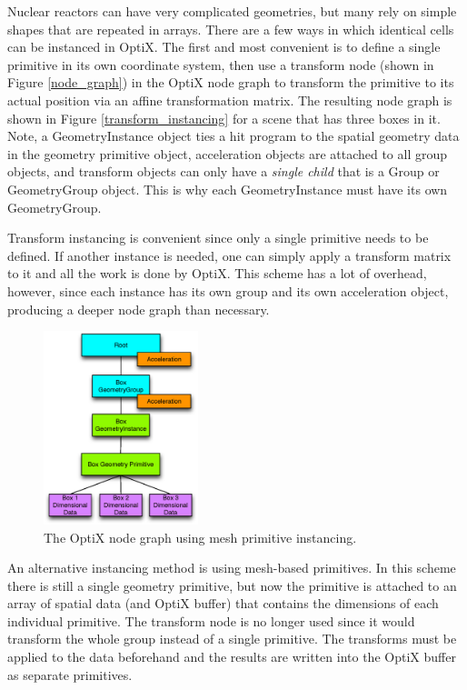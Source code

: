 Nuclear reactors can have very complicated geometries, but many rely on simple shapes that are repeated in arrays.  There are a few ways in which identical cells can be instanced in OptiX.  The first and most convenient is to define a single primitive in its own coordinate system, then use a transform node (shown in Figure \ref{node_graph}) in the OptiX node graph to transform the primitive to its actual position via an affine transformation matrix.  The resulting node graph is shown in Figure \ref{transform_instancing} for a scene that has three boxes in it.  Note, a GeometryInstance object ties a hit program to the spatial geometry data in the geometry primitive object, acceleration objects are attached to all group objects, and transform objects can only have a \emph{single child} that is a Group or GeometryGroup object.  This is why each GeometryInstance must have its own GeometryGroup.

Transform instancing is convenient since only a single primitive needs to be defined.  If another instance is needed, one can simply apply a transform matrix to it and all the work is done by OptiX.  This scheme has a lot of overhead, however, since each instance has its own group and its own acceleration object, producing a deeper node graph than necessary.

\begin{figure}[h!] 
  \centering
    \includegraphics[width=0.4\textwidth]{graphics/primitive_instancing.eps}
     \caption{The OptiX node graph using mesh primitive instancing. \label{primitive_instancing} }
\end{figure}

An alternative instancing method is using mesh-based primitives.  In this scheme there is still a single geometry primitive, but now the primitive is attached to an array of spatial data (and OptiX buffer) that contains the dimensions of each individual primitive.  The transform node is no longer used since it would transform the whole group instead of a single primitive.   The transforms must be applied to the data beforehand and the results are written into the OptiX buffer as separate primitives.  

